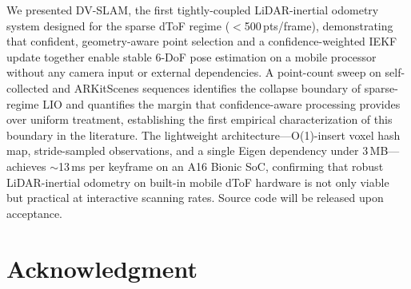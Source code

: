 We presented DV-SLAM, the first tightly-coupled LiDAR-inertial odometry system designed for the sparse dToF regime ($<$500\,pts/frame), demonstrating that confident, geometry-aware point selection and a confidence-weighted IEKF update together enable stable 6-DoF pose estimation on a mobile processor without any camera input or external dependencies. A point-count sweep on self-collected and ARKitScenes sequences identifies the collapse boundary of sparse-regime LIO and quantifies the margin that confidence-aware processing provides over uniform treatment, establishing the first empirical characterization of this boundary in the literature. The lightweight architecture---O(1)-insert voxel hash map, stride-sampled observations, and a single Eigen dependency under 3\,MB---achieves $\sim$13\,ms per keyframe on an A16 Bionic SoC, confirming that robust LiDAR-inertial odometry on built-in mobile dToF hardware is not only viable but practical at interactive scanning rates. Source code will be released upon acceptance.

\section*{Acknowledgment}

